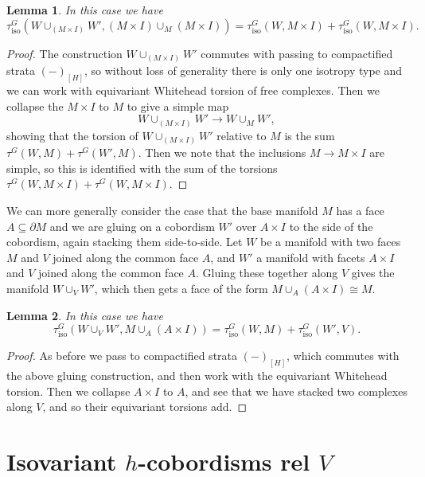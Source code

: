 \documentclass[11pt]{amsart}
\newtheorem{lem}{Lemma}[section]
\theoremstyle{definition}
\numberwithin{equation}{section}
\numberwithin{figure}{section}
\newcommand{\iso}{\mathrm{iso}}
\begin{document}
\begin{lem}\label{add_in_iso_wh_side}
	In this case we have
	\[ \tau^G_{\iso}(W \cup_{(M \times I)} W', (M \times I) \cup_M (M \times I)) = \tau^G_{\iso}(W, M \times I) + \tau^G_{\iso}(W, M \times I). \]
\end{lem}

\begin{proof}
	The construction $W \cup_{(M \times I)} W'$ commutes with passing to compactified strata $(-)_{[H]}$, so without loss of generality there is only one isotropy type and we can work with equivariant Whitehead torsion of free complexes. Then we collapse the $M \times I$ to $M$ to give a simple map
	\[ W \cup_{(M \times I)} W' \to W \cup_{M} W', \]
	showing that the torsion of $W \cup_{(M \times I)} W'$ relative to $M$ is the sum $\tau^G(W,M) + \tau^G(W',M)$. Then we note that the inclusions $M \to M \times I$ are simple, so this is identified with the sum of the torsions $\tau^G(W, M \times I) + \tau^G(W, M \times I)$.
\end{proof}

We can more generally consider the case that the base manifold $M$ has a face $A \subseteq \partial M$ and we are gluing on a cobordism $W'$ over $A \times I$ to the side of the cobordism, again stacking them side-to-side. Let $W$ be a manifold with two faces $M$ and $V$ joined along the common face $A$, and $W'$ a manifold with facets $A \times I$ and $V$ joined along the common face $A$. Gluing these together along $V$ gives the manifold $W \cup_{V} W'$, which then gets a face of the form $M \cup_A (A \times I) \cong M$.

\begin{lem}\label{add_in_iso_wh_side_2}
	In this case we have
	\[ \tau^G_{\iso}(W \cup_{V} W', M \cup_A (A \times I)) = \tau^G_{\iso}(W, M) + \tau^G_{\iso}(W',V). \]
\end{lem}

\begin{proof}
	As before we pass to compactified strata $(-)_{[H]}$, which commutes with the above gluing construction, and then work with the equivariant Whitehead torsion. Then we collapse $A \times I$ to $A$, and see that we have stacked two complexes along $V$, and so their equivariant torsions add.
\end{proof}




\section{Isovariant $h$-cobordisms rel $V$}
\end{document}

